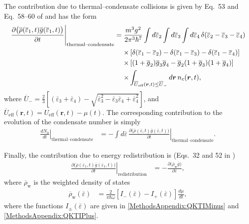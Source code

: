 The contribution due to thermal--condensate collisions is given by Eq.~53 and Eq.~58--60 of \citep{Bijlsma:2000} and has the form
\begin{align}
    \begin{split}
        \left. \frac{\partial\big(\overline{\rho}(\overline{\varepsilon}_1, t) \overline{g}(\overline{\varepsilon}_1, t)\big)}{\partial t}\right|_\text{thermal--condensate} &= \frac{m^3 g^2}{2 \pi^3 \hbar^7} \int d \overline{\varepsilon}_2 \int d\overline{\varepsilon}_3 \int d\overline{\varepsilon}_4 \,\delta(\overline{\varepsilon}_2 - \overline{\varepsilon}_3 - \overline{\varepsilon}_4)\\
        &\relphantom{=}\times\left[ \delta(\overline{\varepsilon}_1 - \overline{\varepsilon}_2) - \delta(\overline{\varepsilon}_1 - \overline{\varepsilon}_3) - \delta(\overline{\varepsilon}_1- \overline{\varepsilon}_4)\right]\\
        &\relphantom{=} \times \left[(1+\overline{g}_2)\overline{g}_3 \overline{g}_4 - \overline{g}_2 (1+\overline{g}_3)(1+\overline{g}_4) \right]\\
        &\relphantom{=}\times  \int_{\overline{U}_\text{eff}(\bm{r}, t) \leq \overline{U}_-} d \bm{r}\, n_c(\bm{r}, t),
    \end{split}
    \label{MethodsAppendix:QKTRhoGThermalCondensateEvolution}
\end{align}
where $\displaystyle \overline{U}_- = \frac{2}{3}\left[(\overline{\varepsilon}_3 + \overline{\varepsilon}_4)-\sqrt{\overline{\varepsilon}_3^2 - \overline{\varepsilon}_3 \overline{\varepsilon}_4 + \overline{\varepsilon}_4^2}\right]$, and $\overline{U}_\text{eff}(\bm{r}, t) = U_\text{eff}(\bm{r}, t) - \mu(t)$.
The corresponding contribution to the evolution of the condensate number is simply
\begin{align}
    \left. \frac{d N_0}{d t}\right|_\text{thermal--condensate} &= - \int d\overline{\varepsilon} \,\left. \frac{\partial\big(\overline{\rho}(\overline{\varepsilon}, t) \overline{g}(\overline{\varepsilon}, t)\big)}{\partial t}\right|_\text{thermal--condensate}.
    \label{MethodsAppendix:QKTNThermalCondensateEvolution}
\end{align}


Finally, the contribution due to energy redistribution is (Eqs.~32 and 52 in \citep{Bijlsma:2000})
\begin{align}
    \left. \frac{\partial\big(\overline{\rho}(\overline{\varepsilon}_1, t) \overline{g}(\overline{\varepsilon}_1, t)\big)}{\partial t}\right|_\text{redistribution} &= - \frac{\partial \big( \overline{\rho}_\text{w} \overline{g}\big)}{\partial \overline{\varepsilon}},
    \label{MethodsAppendix:QKTRedistributionEvolution}
\end{align}
where $\overline{\rho}_\text{w}$ is the weighted density of states
\begin{align}
    \overline{\rho}_\text{w}(\overline{\varepsilon}) &= \frac{2}{\pi \hbar \overline{\omega}} \left[ I_-(\overline{\varepsilon}) - I_+(\overline{\varepsilon})\right] \frac{d \mu}{dt},
\end{align}
where the functions $I_\pm(\overline{\varepsilon})$ are given in \eqref{MethodsAppendix:QKTIMinus} and \eqref{MethodsAppendix:QKTIPlus}.


